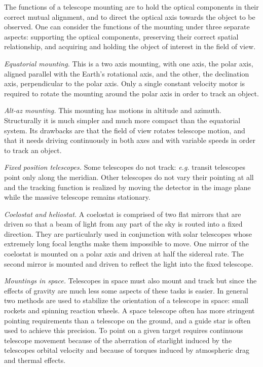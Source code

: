 The functions of a telescope mounting are to hold the optical components 
in their correct mutual alignment, and to direct the optical axis towards the
object to be observed. One can consider the functions of the mounting under 
three separate aspects: supporting the optical components, preserving their 
correct spatial relationship, and acquiring and holding the object of interest 
in the field of view.

\noindent
{\it Equatorial mounting.} This is a two axis mounting, with one axis, the polar axis,
aligned parallel with the Earth's rotational axis, and the other, the declination axis,
perpendicular to the polar axis. Only a single constant velocity motor is required 
to rotate the mounting around the polar axis in order to track an object.

\noindent
{\it Alt-az mounting.} This mounting has motions in altitude and azimuth. Structurally 
it is much simpler and much more compact than the equatorial system. Its drawbacks are 
that the field of view
rotates telescope motion, and that it needs driving continuously in both axes and with 
variable speeds in order to track an object. 

\noindent
{\it Fixed position telescopes.} Some telescopes do not track: {\it e.g.} transit telescopes
point only along the meridian. Other telescopes do not vary their pointing at all and
the tracking function is realized by moving the detector in the image plane while the 
massive telescope remains stationary.

\noindent
{\it Coelostat and heliostat.} A coelostat is comprised of two flat mirrors that are driven 
so that a beam of light from any part of the sky is routed into a fixed direction. They are
particularly used in conjunction with solar telescopes whose extremely long focal lengths
make them impossible to move. One mirror of the coelostat is mounted on a polar axis and
driven at half the sidereal rate. The second mirror is mounted and driven to reflect the light
into the fixed telescope.

\noindent
{\it Mountings in space.} Telescopes in space must also mount and track but since the 
effects of gravity are much less some aspects of these tasks is easier. In general two methods
are used to stabilize the orientation of a telescope in space: small rockets and spinning 
reaction wheels. A space telescope often has more stringent pointing requirements than
a telescope on the ground, and a guide star is often used to achieve this precision. To point
on a given target requires continuous telescope movement because of the aberration of 
starlight induced by the telescopes orbital velocity and because of torques induced by 
atmospheric drag and thermal effects. 

